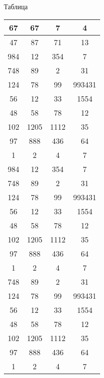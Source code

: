 \documentclass{bacgost}
\begin{document}
\begin{gostappendix}{Таблица}
\begin{table}[H]
\centering
\begin{tabular}{|c|c|c|c|}
\hline 
67 & 67 & 7 & 4 \\ 
\hline 
47 & 87 & 71 & 13 \\ 
\hline 
984 & 12 & 354 & 7 \\ 
\hline 
748 & 89 & 2 & 31 \\ 
\hline 
124 & 78 & 99 & 993431 \\ 
\hline 
56 & 12 & 33 & 1554 \\ 
\hline 
48 & 58 & 78 & 12 \\ 
\hline 
102 & 1205 & 1112 & 35 \\ 
\hline 
97 & 888 & 436 & 64 \\ 
\hline 
1 & 2 & 4 & 7 \\ 
984 & 12 & 354 & 7 \\ 
\hline 
748 & 89 & 2 & 31 \\ 
\hline 
124 & 78 & 99 & 993431 \\ 
\hline 
56 & 12 & 33 & 1554 \\ 
\hline 
48 & 58 & 78 & 12 \\ 
\hline 
102 & 1205 & 1112 & 35 \\ 
\hline 
97 & 888 & 436 & 64 \\ 
\hline 
1 & 2 & 4 & 7 \\ 
748 & 89 & 2 & 31 \\ 
\hline 
124 & 78 & 99 & 993431 \\ 
\hline 
56 & 12 & 33 & 1554 \\ 
\hline 
48 & 58 & 78 & 12 \\ 
\hline 
102 & 1205 & 1112 & 35 \\ 
\hline 
97 & 888 & 436 & 64 \\ 
\hline 
1 & 2 & 4 & 7 \\ 
\hline 
\end{tabular} 
\end{table}
\end{gostappendix}
\end{document}
